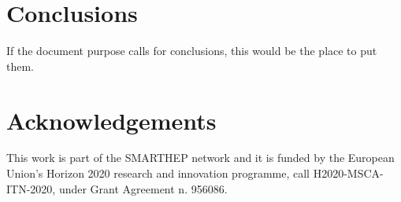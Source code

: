 \documentclass{smarthepnote}
\begin{document}
\section{Conclusions}
If the document purpose calls for conclusions, this would be the place to put them.

\section*{Acknowledgements}
This work is part of the SMARTHEP network and it is funded by the European Union’s Horizon 2020 research and innovation programme, call H2020-MSCA-ITN-2020, under Grant Agreement n. 956086. 



\end{document}
